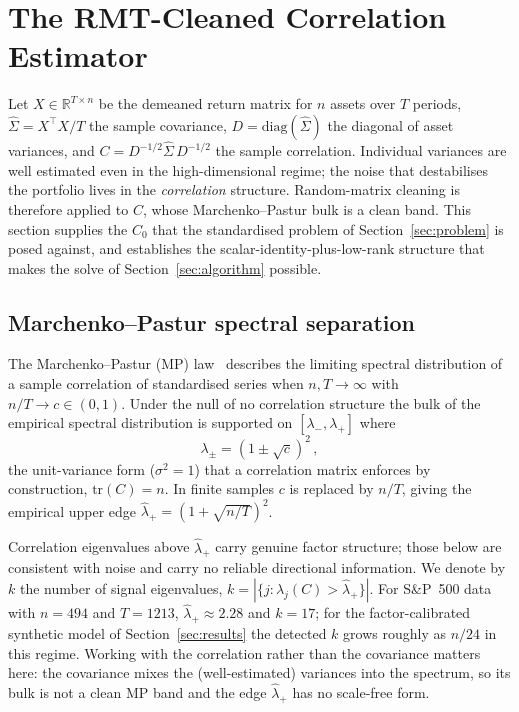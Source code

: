 \section{The RMT-Cleaned Correlation Estimator}\label{sec:rmt}

Let $X \in \mathbb{R}^{T \times n}$ be the demeaned return matrix for $n$ assets
over $T$ periods, $\hat\Sigma = X^\top X / T$ the sample covariance,
$D = \mathrm{diag}(\hat\Sigma)$ the diagonal of asset variances, and
$C = D^{-1/2}\hat\Sigma\,D^{-1/2}$ the sample correlation. Individual variances are
well estimated even in the high-dimensional regime; the noise that destabilises
the portfolio lives in the \emph{correlation} structure. Random-matrix cleaning is
therefore applied to $C$, whose Marchenko--Pastur bulk is a clean band. This
section supplies the $C_0$ that the standardised problem of
Section~\ref{sec:problem} is posed against, and establishes the
scalar-identity-plus-low-rank structure that makes the solve of
Section~\ref{sec:algorithm} possible.

\subsection{Marchenko--Pastur spectral separation}

The Marchenko--Pastur (MP) law~\cite{marchenko1967} describes the limiting spectral
distribution of a sample correlation of standardised series when $n, T \to \infty$
with $n/T \to c \in (0,1)$. Under the null of no correlation structure the bulk of
the empirical spectral distribution is supported on $[\lambda_-, \lambda_+]$ where
\[
  \lambda_{\pm} = (1 \pm \sqrt{c})^2\,,
\]
the unit-variance form ($\sigma^2 = 1$) that a correlation matrix enforces by
construction, $\mathrm{tr}(C) = n$. In finite samples $c$ is replaced by $n/T$,
giving the empirical upper edge $\hat\lambda_+ = (1 + \sqrt{n/T})^2$.

Correlation eigenvalues above $\hat\lambda_+$ carry genuine factor structure;
those below are consistent with noise and carry no reliable directional
information. We denote by $k$ the number of signal eigenvalues,
$k = |\{j : \lambda_j(C) > \hat\lambda_+\}|$. For S\&P~500 data with $n = 494$ and
$T = 1213$, $\hat\lambda_+ \approx 2.28$ and $k = 17$; for the factor-calibrated
synthetic model of Section~\ref{sec:results} the detected $k$ grows roughly as
$n/24$ in this regime. Working with the correlation rather than the covariance
matters here: the covariance mixes the (well-estimated) variances into the
spectrum, so its bulk is not a clean MP band and the edge $\hat\lambda_+$ has no
scale-free form.

